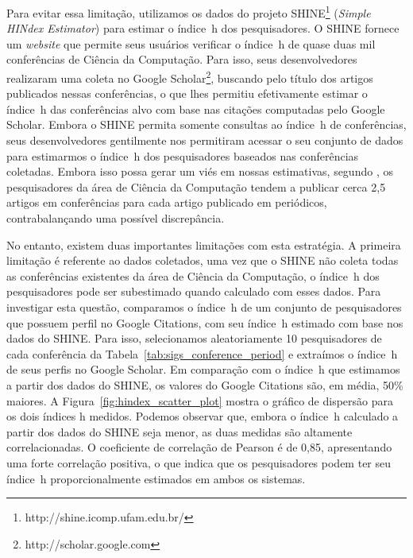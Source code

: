 Para evitar essa limitação, utilizamos os dados do projeto SHINE\footnote{http://shine.icomp.ufam.edu.br/}
(\textit{Simple HINdex Estimator}) para estimar o índice~h dos pesquisadores.
O SHINE fornece um \textit{website} que permite seus usuários verificar o índice~h de quase 
duas mil conferências de Ciência da Computação. Para isso, seus desenvolvedores realizaram 
uma coleta no Google Scholar\footnote{http://scholar.google.com}, buscando pelo título dos 
artigos publicados nessas conferências, o que lhes permitiu efetivamente estimar o índice~h 
das conferências alvo com base nas citações computadas pelo Google Scholar. Embora o SHINE 
permita somente consultas ao índice~h de conferências, seus desenvolvedores gentilmente nos 
permitiram acessar o seu conjunto de dados para estimarmos o índice~h dos pesquisadores 
baseados nas conferências coletadas. Embora isso possa gerar um viés em nossas estimativas, 
segundo \cite{Laender2008}, os pesquisadores da área de Ciência da Computação tendem a 
publicar cerca 2,5 artigos em conferências para cada artigo publicado em periódicos, contrabalançando
uma possível discrepância.
% 

No entanto, existem duas importantes limitações com esta estratégia. A primeira limitação 
é referente ao dados coletados, uma vez que o SHINE não coleta todas as conferências 
existentes da área de Ciência da Computação, o índice~h dos pesquisadores pode ser 
subestimado quando calculado com esses dados. Para investigar esta questão, comparamos 
o índice~h de um conjunto de pesquisadores que possuem perfil no Google Citations, 
com seu índice~h estimado com base nos dados do SHINE. Para isso, selecionamos 
aleatoriamente 10 pesquisadores de cada conferência da Tabela~\ref{tab:sigs_conference_period} 
e extraímos o índice~h de seus perfis no Google Scholar. Em comparação com o índice~h 
que estimamos a partir dos dados do SHINE, os valores do Google Citations são, 
em média, 50\% maiores. A Figura~\ref{fig:hindex_scatter_plot} mostra o gráfico de 
dispersão para os dois índices h medidos. Podemos observar que, embora o índice~h 
calculado a partir dos dados do SHINE seja menor, as duas medidas são altamente 
correlacionadas. O coeficiente de correlação de Pearson é de 0,85, apresentando 
uma forte correlação positiva, o que indica que os pesquisadores podem ter seu 
índice~h proporcionalmente estimados em ambos os sistemas.

